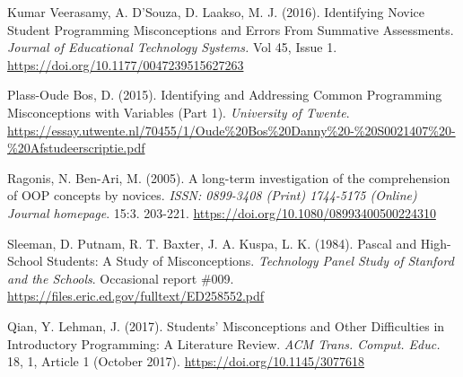 \documentclass[twocolumn]{article}
\begin{document}
\begin{thebibliography}{9}
Kumar Veerasamy, A. D’Souza, D. Laakso, M. J. (2016). Identifying Novice Student Programming Misconceptions and Errors From Summative Assessments. \emph{Journal of Educational Technology Systems.} Vol 45, Issue 1.  
\url{https://doi.org/10.1177/0047239515627263}

Plass-Oude Bos, D.  (2015). Identifying and Addressing Common Programming Misconceptions with Variables (Part 1). \emph{University of Twente}.
\url{https://essay.utwente.nl/70455/1/Oude\%20Bos\%20Danny\%20-\%20S0021407\%20-\%20Afstudeerscriptie.pdf}

Ragonis, N. Ben-Ari, M. (2005). A long-term investigation of the comprehension of OOP concepts by novices. \emph{ISSN: 0899-3408 (Print) 1744-5175 (Online) Journal homepage}. 15:3. 203-221. 
\url{https://doi.org/10.1080/08993400500224310}

Sleeman, D. Putnam, R. T. Baxter, J. A. Kuspa, L. K. (1984). Pascal and High-School Students: A Study of Misconceptions. \emph{Technology Panel Study of Stanford and the Schools}. Occasional report \#009. 
\url{https://files.eric.ed.gov/fulltext/ED258552.pdf}

Qian, Y. Lehman, J. (2017). Students’ Misconceptions and Other Difficulties in Introductory Programming: A Literature Review. \emph{ACM Trans. Comput. Educ.} 18, 1, Article 1 (October 2017).
\url{https://doi.org/10.1145/3077618} 



\end{thebibliography}
\end{document}
